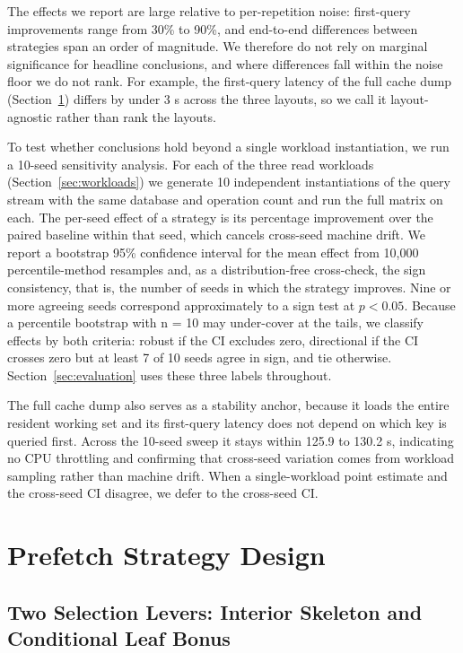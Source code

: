 \documentclass[sigconf, nonacm]{acmart}
\begin{document}
The effects we report are large relative to per-repetition noise: first-query improvements range from 30\% to 90\%, and end-to-end differences between strategies span an order of magnitude. We therefore do not rely on marginal significance for headline conclusions, and where differences fall within the noise floor we do not rank. For example, the first-query latency of the full cache dump (Section~\ref{sec:strategy}) differs by under 3 \textmu s across the three layouts, so we call it layout-agnostic rather than rank the layouts.

To test whether conclusions hold beyond a single workload instantiation, we run a 10-seed sensitivity analysis. For each of the three read workloads (Section~\ref{sec:workloads}) we generate 10 independent instantiations of the query stream with the same database and operation count and run the full matrix on each. The per-seed effect of a strategy is its percentage improvement over the paired baseline within that seed, which cancels cross-seed machine drift. We report a bootstrap 95\% confidence interval for the mean effect from 10,000 percentile-method resamples and, as a distribution-free cross-check, the sign consistency, that is, the number of seeds in which the strategy improves. Nine or more agreeing seeds correspond approximately to a sign test at $p < 0.05$. Because a percentile bootstrap with n = 10 may under-cover at the tails, we classify effects by both criteria: robust if the CI excludes zero, directional if the CI crosses zero but at least 7 of 10 seeds agree in sign, and tie otherwise. Section~\ref{sec:evaluation} uses these three labels throughout.

The full cache dump also serves as a stability anchor, because it loads the entire resident working set and its first-query latency does not depend on which key is queried first. Across the 10-seed sweep it stays within 125.9 to 130.2 \textmu s, indicating no CPU throttling and confirming that cross-seed variation comes from workload sampling rather than machine drift. When a single-workload point estimate and the cross-seed CI disagree, we defer to the cross-seed CI.

\section{Prefetch Strategy Design}\label{sec:strategy}

\subsection{Two Selection Levers: Interior Skeleton and Conditional Leaf Bonus}\label{sec:dual-lever}
\end{document}

